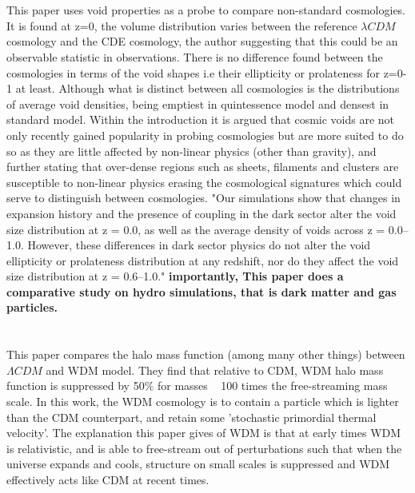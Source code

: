 \documentclass[fleqn,usenatbib]{mnras}
\begin{document}
\section{\citet{Adermann_17}}
This paper uses void properties as a probe to compare non-standard cosmologies. It is found at z=0, the volume distribution varies between the reference $\lambda CDM$ cosmology and the CDE cosmology, the author suggesting that this could be an observable statistic in observations. There is no difference found between the cosmologies in terms of the void shapes i.e their ellipticity or prolateness for z=0-1 at least. Although what is distinct between all cosmologies is the distributions of average void densities, being emptiest in quintessence model and densest in standard model.
Within the introduction it is argued that cosmic voids are not only recently gained popularity in probing cosmologies but are more suited to do so as they are little affected by non-linear physics (other than gravity), and further stating that over-dense regions such as sheets, filaments and clusters are susceptible to non-linear physics erasing the cosmological signatures which could serve to distinguish between cosmologies. "Our simulations show that changes in expansion history and the presence of coupling in the dark sector alter the void size distribution at z = 0.0, as well as the average density of voids across z = 0.0–1.0. However, these differences in dark sector physics do not alter the void ellipticity or prolateness distribution at any redshift, nor do they affect the void size distribution at z = 0.6–1.0." \citep{Adermann_17} \textbf{importantly, This paper does a comparative study on hydro simulations, that is dark matter and gas particles.}

\section{\citet{Carlesi_14a}}

\section{\citet{Carlesi_14b}}

\section{\citet{Schneider_12}}

\section{\citet{Smith_11}}
This paper compares the halo mass function (among many other things) between $\Lambda CDM$ and WDM model. They find that relative to CDM, WDM halo mass function is suppressed by 50$\%$ for masses ~ 100 times the free-streaming mass scale. In this work, the WDM cosmology is to contain a particle which is lighter than the CDM counterpart, and retain some 'stochastic primordial thermal velocity'. The explanation this paper gives of WDM is that at early times WDM is relativistic, and is able to free-stream out of perturbations such that when the universe expands and cools, structure on small scales is suppressed and WDM effectively acts like CDM at recent times.
\end{document}
